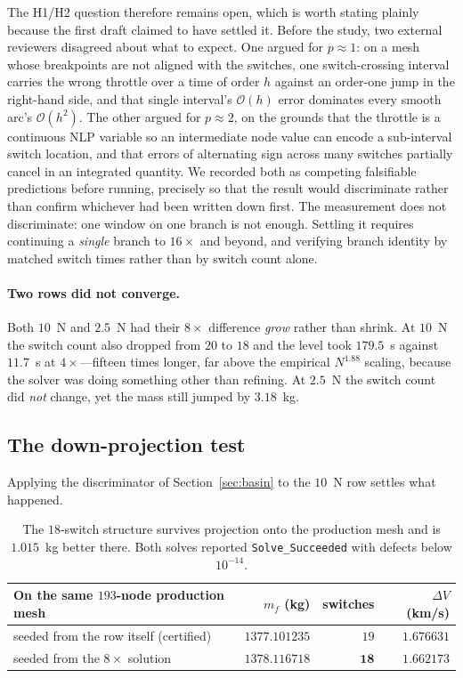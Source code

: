 \documentclass[11pt]{article}
\newcommand{\mf}{m_f}
\newcommand{\dV}{\Delta V}
\begin{document}
The H1/H2 question therefore remains open, which is worth stating plainly
because the first draft claimed to have settled it. Before the study, two
external reviewers disagreed about what to expect. One argued for
$p \approx 1$: on a mesh whose breakpoints
are not aligned with the switches, one switch-crossing interval carries the
wrong throttle over a time of order $h$ against an order-one jump in the
right-hand side, and that single interval's $\mathcal{O}(h)$ error dominates
every smooth arc's $\mathcal{O}(h^2)$. The other argued for $p \approx 2$,
on the grounds that the throttle is a continuous NLP variable so an
intermediate node value can encode a sub-interval switch location, and that
errors of alternating sign across many switches partially cancel in an
integrated quantity. We recorded both as competing falsifiable predictions before running, precisely
so that the result would discriminate rather than confirm whichever had been
written down first. The measurement does not discriminate: one window on one
branch is not enough. Settling it requires continuing a \emph{single} branch
to $16\times$ and beyond, and verifying branch identity by matched switch
times rather than by switch count alone.

\paragraph{Two rows did not converge.} Both $10$~N and $2.5$~N had their
$8\times$ difference \emph{grow} rather than shrink. At $10$~N the switch count
also dropped from $20$ to $18$ and the level took $179.5$~s against $11.7$~s at
$4\times$---fifteen times longer, far above the empirical $N^{1.88}$ scaling,
because the solver was doing something other than refining. At $2.5$~N the
switch count did \emph{not} change, yet the mass still jumped by $3.18$~kg.

\subsection{The down-projection test}

Applying the discriminator of Section~\ref{sec:basin} to the $10$~N row settles
what happened.

\begin{table}[h]
\centering
\small
\begin{tabular}{lrrr}
\toprule
On the same $193$-node production mesh & $\mf$ (kg) & switches & $\dV$ (km/s) \\
\midrule
seeded from the row itself (certified) & $1377.101235$ & $19$ & $1.676631$ \\
seeded from the $8\times$ solution     & $\mathbf{1378.116718}$ & $\mathbf{18}$ & $\mathbf{1.662173}$ \\
\bottomrule
\end{tabular}
\caption{The $18$-switch structure survives projection onto the production
mesh and is $1.015$~kg better there. Both solves reported
\texttt{Solve\_Succeeded} with defects below $10^{-14}$.}
\end{table}
\end{document}
